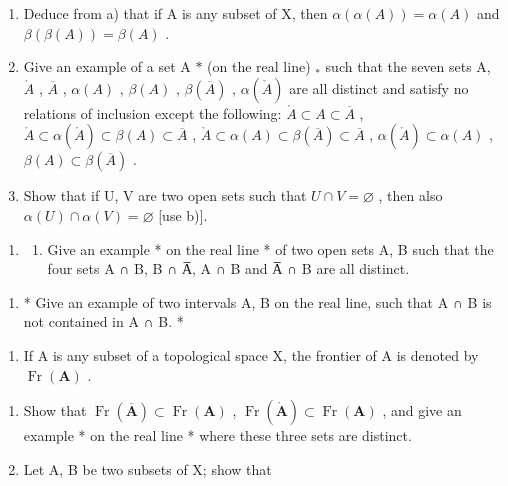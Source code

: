 \begin{enumerate}
\def\labelenumi{\alph{enumi})}
\setcounter{enumi}{1}
\item
  Deduce from a) that if A is any subset of X, then \(\alpha(\alpha(A)) = \alpha(A)\) and \(\beta(\beta(A)) = \beta(A)\) .
\item
  Give an example of a set A \(*\) (on the real line) \(_{*}\) such that the seven sets A, \(\mathring{A}\) , \(\overline{A}\) , \(\alpha(A)\) , \(\beta(A)\) , \(\beta(\overline{A})\) , \(\alpha(\mathring{A})\) are all distinct and satisfy no relations of inclusion except the following: \(\mathring{A} \subset A \subset \overline{A}\) , \(\mathring{A} \subset \alpha(\mathring{A}) \subset \beta(A) \subset \overline{A}\) , \(\mathring{A} \subset \alpha(A) \subset \beta(\overline{A}) \subset \overline{A}\) , \(\alpha(\mathring{A}) \subset \alpha(A)\) , \(\beta(A) \subset \beta(\overline{A})\) .
\item
  Show that if U, V are two open sets such that \(U \cap V = \varnothing\) , then also \(\alpha(U) \cap \alpha(V) = \varnothing\) {[}use b){]}.
\end{enumerate}

\begin{enumerate}
\def\labelenumi{\arabic{enumi})}
\setcounter{enumi}{3}
\tightlist
\item
  \begin{enumerate}
  \def\labelenumii{\alph{enumii})}
  \tightlist
  \item
    Give an example * on the real line * of two open sets A, B such that the four sets A ∩ B, B ∩ A̅, A ∩ B and A̅ ∩ B are all distinct.
  \end{enumerate}
\end{enumerate}

\begin{enumerate}
\def\labelenumi{\alph{enumi})}
\setcounter{enumi}{1}
\tightlist
\item
  * Give an example of two intervals A, B on the real line, such that A ∩ B is not contained in A ∩ B. *
\end{enumerate}

\begin{enumerate}
\def\labelenumi{\arabic{enumi})}
\setcounter{enumi}{4}
\tightlist
\item
  If A is any subset of a topological space X, the frontier of A is denoted by \(\operatorname{Fr}(\mathbf{A})\) .
\end{enumerate}

\begin{enumerate}
\def\labelenumi{\alph{enumi})}
\item
  Show that \(\operatorname{Fr}(\overline{\mathbf{A}}) \subset \operatorname{Fr}(\mathbf{A})\) , \(\operatorname{Fr}(\mathring{\mathbf{A}}) \subset \operatorname{Fr}(\mathbf{A})\) , and give an example * on the real line * where these three sets are distinct.
\item
  Let A, B be two subsets of X; show that
\end{enumerate}

